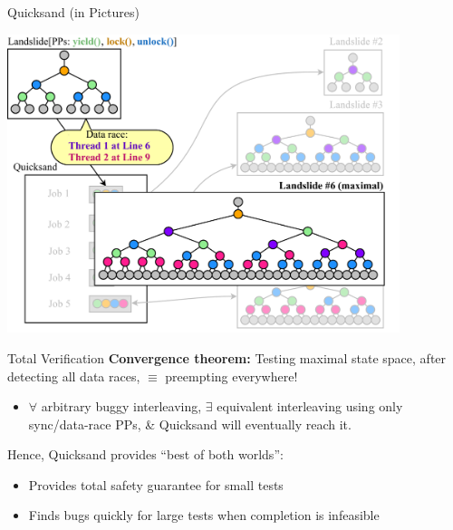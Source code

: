 \documentclass[xcolor=dvipsnames]{beamer}
\begin{document}
\begin{frame}{Quicksand (in Pictures)}
	\begin{center}
	\vspace{-0.88em}
	\includegraphics[width=0.86\textwidth]{dr-jobs-maximal.pdf}
	\end{center}
\end{frame}


\begin{frame}{Total Verification}
	\textbf{Convergence theorem:} Testing maximal state space, after detecting all data races, $\equiv$ preempting everywhere!
	\begin{itemize}
		\item $\forall$ arbitrary buggy interleaving, $\exists$ equivalent interleaving %
			using only sync/data-race PPs, \& Quicksand will eventually reach it.
	\end{itemize}
	\linegap

	Hence, Quicksand provides ``best of both worlds'':
	\begin{itemize}
		\item Provides total safety guarantee for small tests
		\item Finds bugs quickly for large tests when completion is infeasible
	\end{itemize}
\end{frame}
\end{document}
